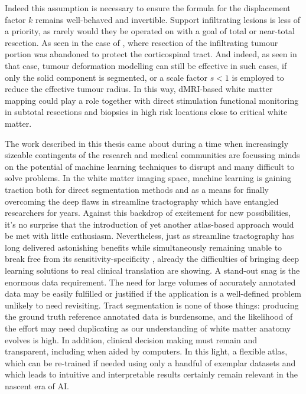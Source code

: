 Indeed this assumption is necessary to ensure the formula for the displacement factor $k$ remains well-behaved and invertible.
Support infiltrating lesions is less of a priority, as rarely  would they be operated on with a goal of total or near-total resection.
As seen in the case of , where resection of the infiltrating tumour portion was abandoned to protect the corticospinal tract.
And indeed, as seen in that case, tumour deformation modelling can still be effective in such cases, if only the solid component is segmented, or a scale factor $s<1$ is employed to reduce the effective tumour radius.
In this way, dMRI-based white matter mapping could play a role together with direct stimulation functional monitoring in subtotal resections and biopsies in high risk locations close to critical white matter.

The work described in this thesis came about during a time when increasingly sizeable contingents of the research and medical communities are focussing minds on the potential of machine learning techniques to disrupt and  many difficult to solve problems.
In the white matter imaging space, machine learning is gaining traction both for direct segmentation methods and as a means for finally overcoming the deep flaws in streamline tractography which have entangled researchers for years.
Against this backdrop of excitement for new possibilities, it's no surprise that the introduction of yet another atlas-based approach would be met with little enthusiasm.
Nevertheless, just as streamline tractography has long delivered astonishing benefits while simultaneously remaining unable to break free from its sensitivity-specificity , already the difficulties of bringing deep learning solutions to real clinical translation are showing.
A stand-out snag is the enormous data requirement.
The need for large volumes of accurately annotated data may be easily fulfilled  or justified if the application is a well-defined problem unlikely to need revisiting.
Tract segmentation is none of those things: producing the ground truth reference annotated data is burdensome, and the likelihood of the effort may need duplicating as our understanding of white matter anatomy evolves is high.
In addition, clinical decision making must remain  and transparent, including when aided by computers.
In this light, a flexible atlas, which can be re-trained if needed using only a handful of exemplar datasets and which leads to intuitive and interpretable results  certainly remain relevant in the nascent era of AI.


